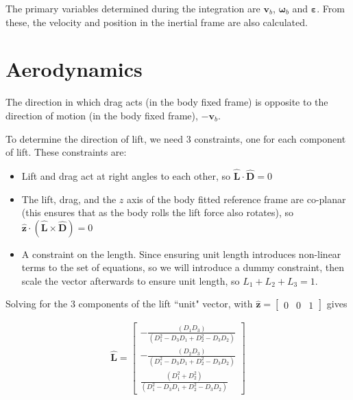 \documentclass[11pt, twoside]{article}
\numberwithin{equation}{section}
\renewcommand{\vec}{\mathbf}
\begin{document}
The primary variables determined during the integration are \(\vec{v}_b\), \(\vec{\omega}_b\) and \(\vec{\varepsilon}\). From these, the velocity and position in the inertial frame are also calculated.


\section{Aerodynamics}

The direction in which drag acts (in the body fixed frame) is opposite to the direction of motion (in the body fixed frame), \(-\vec{v}_b\).

To determine the direction of lift, we need 3 constraints, one for each component of lift. These constraints are:
\begin{itemize}
	\item Lift and drag act at right angles to each other, so \(\hat{\vec{L}} \cdot \hat{\vec{D}} = 0\)
	\item The lift, drag, and the \(z\) axis of the body fitted reference frame are co-planar (this ensures that as the body rolls the lift force also rotates), so \(\hat{\vec{z}} \cdot \left(\hat{\vec{L}} \times \hat{\vec{D}}\right)=0\)
	\item A constraint on the length. Since ensuring unit length introduces non-linear terms to the set of equations, so we will introduce a dummy constraint, then scale the vector afterwards to ensure unit length, so \(L_1 + L_2 + L_3 = 1\).
\end{itemize}

Solving for the 3 components of the lift ``unit" vector, with \(\hat{\vec{z}} = \begin{bmatrix}
0 & 0 & 1
\end{bmatrix}\) gives

\begin{align}
	\hat{\vec{L}} = 
	\begin{bmatrix}
		-\frac{(D_1D_3)}{(D_1^2 - D_3D_1 + D_2^2 - D_3D_2)}\\
      -\frac{(D_2D_3)}{(D_1^2 - D_3D_1 + D_2^2 - D_3D_2)}\\
 \frac{(D_1^2 + D_2^2)}{(D_1^2 - D_3D_1 + D_2^2 - D_3D_2)}
	\end{bmatrix}
\end{align}
\end{document}
